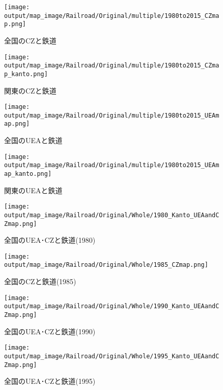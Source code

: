 \documentclass{ltjsarticle}
\begin{document}
\begin{figure}[pbth]
  \centering
  \texttt{[image: output/map\_image/Railroad/Original/multiple/1980to2015\_CZmap.png]}
  \caption{\label{allCZandRail}全国のCZと鉄道}
\end{figure}

\begin{figure}[pbth]
  \centering
  \texttt{[image: output/map\_image/Railroad/Original/multiple/1980to2015\_CZmap\_kanto.png]}
  \caption{\label{KanCZandRail}関東のCZと鉄道}
\end{figure}


\begin{figure}[pbth]
  \centering
  \texttt{[image: output/map\_image/Railroad/Original/multiple/1980to2015\_UEAmap.png]}
  \caption{\label{allUEAandRail}全国のUEAと鉄道}
\end{figure}


\begin{figure}[pbth]
  \centering
  \texttt{[image: output/map\_image/Railroad/Original/multiple/1980to2015\_UEAmap\_kanto.png]}
  \caption{\label{KanUEAandRail}関東のUEAと鉄道}
\end{figure}


\begin{figure}[pbth]
  \centering
  \texttt{[image: output/map\_image/Railroad/Original/Whole/1980\_Kanto\_UEAandCZmap.png]}
  \caption{\label{1980:allCZandUEA:Rail}全国のUEA･CZと鉄道(1980)}
\end{figure}


\begin{figure}[pbth]
  \centering
  \texttt{[image: output/map\_image/Railroad/Original/Whole/1985\_CZmap.png]}
  \caption{\label{1985:allCZandUEA:Rail}全国のCZと鉄道(1985)}
\end{figure}


\begin{figure}[pbth]
  \centering
  \texttt{[image: output/map\_image/Railroad/Original/Whole/1990\_Kanto\_UEAandCZmap.png]}
  \caption{\label{1990:allCZandUEA:Rail}全国のUEA･CZと鉄道(1990)}
\end{figure}


\begin{figure}[pbth]
  \centering
  \texttt{[image: output/map\_image/Railroad/Original/Whole/1995\_Kanto\_UEAandCZmap.png]}
  \caption{\label{1995:allCZandUEA:Rail}全国のUEA･CZと鉄道(1995)}
\end{figure}
\end{document}
